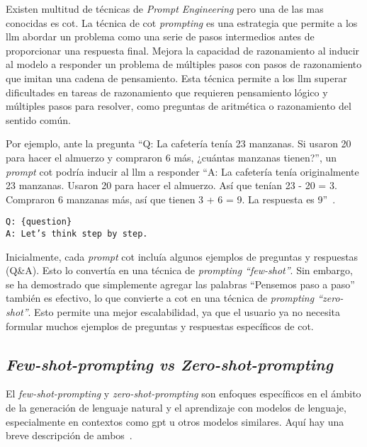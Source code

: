 Existen multitud de técnicas de \textit{Prompt Engineering} pero una de las mas conocidas es \acrfull{cot}. La técnica de \acrlong{cot} \textit{prompting} es una estrategia que permite a los \acrshort{llm} abordar un problema como una serie de pasos intermedios antes de proporcionar una respuesta final. Mejora la capacidad de razonamiento al inducir al modelo a responder un problema de múltiples pasos con pasos de razonamiento que imitan una cadena de pensamiento. Esta técnica permite a los \acrshort{llm} superar dificultades en tareas de razonamiento que requieren pensamiento lógico y múltiples pasos para resolver, como preguntas de aritmética o razonamiento del sentido común.

Por ejemplo, ante la pregunta ``Q: La cafetería tenía 23 manzanas. Si usaron 20 para hacer el almuerzo y compraron 6 más, ¿cuántas manzanas tienen?'', un \textit{prompt} \acrshort{cot} podría inducir al \acrshort{llm} a responder ``A: La cafetería tenía originalmente 23 manzanas. Usaron 20 para hacer el almuerzo. Así que tenían 23 - 20 = 3. Compraron 6 manzanas más, así que tienen 3 + 6 = 9. La respuesta es 9''~\cite{wei2023chainofthought}.

\begin{verbatim}
Q: {question}
A: Let’s think step by step.
\end{verbatim}

Inicialmente, cada \textit{prompt} \acrshort{cot} incluía algunos ejemplos de preguntas y respuestas (Q\&A). Esto lo convertía en una técnica de \textit{prompting ``few-shot''}. Sin embargo, se ha demostrado que simplemente agregar las palabras ``Pensemos paso a paso'' también es efectivo, lo que convierte a \acrshort{cot} en una técnica de \textit{prompting ``zero-shot''}. Esto permite una mejor escalabilidad, ya que el usuario ya no necesita formular muchos ejemplos de preguntas y respuestas específicos de \acrshort{cot}.

\subsection{\textit{Few-shot-prompting vs Zero-shot-prompting}}

El \textit{few-shot-prompting} y \textit{zero-shot-prompting} son enfoques específicos en el ámbito de la generación de lenguaje natural y el aprendizaje con modelos de lenguaje, especialmente en contextos como \acrshort{gpt} u otros modelos similares. Aquí hay una breve descripción de ambos~\cite{Low-shot}.

